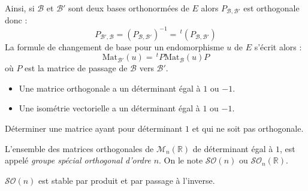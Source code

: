 \documentclass[french,11pt,twoside]{VcCours}
\begin{document}
\begin{Demonstration}{}
\vspace*{3cm}
\end{Demonstration}

\begin{Remarque}{} Ainsi, si $\mathcal{B}$ et $\mathcal{B}'$ sont deux bases orthonormées de $E$ alors $P_{\mathcal{B}, \mathcal{B}'}$ est orthogonale donc :
$$P_{\mathcal{B}', \mathcal{B}} = (P_{\mathcal{B}, \mathcal{B}'})^{-1} = \, ^t(P_{\mathcal{B}, \mathcal{B}'})$$
La formule de changement de base pour un endomorphisme $u$ de $E$ s'écrit alors :
$$ \textrm{Mat}_{\mathcal{B'}}(u) = \,  ^tP \textrm{Mat}_{\mathcal{B}}(u) P$$
où $P$ est la matrice de passage de $\mathcal{B}$ vers $\mathcal{B}'$.
\end{Remarque}

\begin{Proposition}{} 
\begin{itemize}
\item Une matrice orthogonale a un déterminant égal à $1$ ou $-1$.
\item Une isométrie vectorielle a un déterminant égal à $1$ ou $-1$.
\end{itemize}
\end{Proposition}

\begin{Demonstration}{}
\vspace*{4cm}
\end{Demonstration}

\begin{ApplicationDirecte}{} Déterminer une matrice ayant pour déterminant $1$ et qui ne soit pas orthogonale.
\end{ApplicationDirecte}

\begin{Definition}{} L'ensemble des matrices orthogonales de $\mathcal{M}_n(\mathbb{R})$ de déterminant égal à $1$, est appelé \emph{groupe spécial orthogonal d'ordre $n$}. On le note $\mathcal{SO}(n)$ ou $\mathcal{SO}_n(\mathbb{R})$.
\end{Definition}

\begin{Proposition}{} $\mathcal{SO}(n)$ est stable par produit et par passage à l'inverse.
\end{Proposition}

\begin{Demonstration}{}

\vspace*{3cm}
\end{Demonstration}
\end{document}
